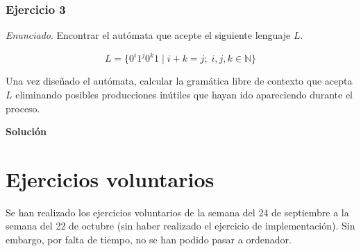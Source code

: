 \documentclass[11pt,a4paper]{article}
\newcommand{\enu}{\textit{Enunciado}}
\newcommand{\sol}{\textbf{Solución}}
\begin{document}
		\subsubsection{Ejercicio 3}
		\enu. Encontrar el autómata que acepte el siguiente lenguaje $L$.
		
		\[L = \lbrace 0^i 1^j 0^k 1 \; | \; i + k = j; \; i, j, k \in \mathbb{N} \rbrace\]
		
		Una vez diseñado el autómata, calcular la gramática libre de contexto que acepta $L$ eliminando posibles producciones
		inútiles que hayan ido apareciendo durante el proceso. \par
		
		\sol \par
		
	\newpage
	\section{Ejercicios voluntarios}
	
	Se han realizado los ejercicios voluntarios de la semana del 24 de septiembre a la semana del 22 de octubre (sin haber
	realizado el ejercicio de implementación). Sin embargo, por falta de tiempo, no se han podido pasar a ordenador.
	
\end{document}
